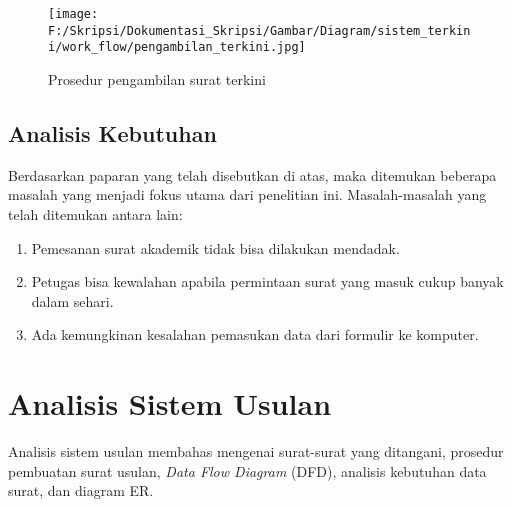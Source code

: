 \begin{figure}[H]
	\centering
		\texttt{[image: F:/Skripsi/Dokumentasi\_Skripsi/Gambar/Diagram/sistem\_terkini/work\_flow/pengambilan\_terkini.jpg]}
	{\caption{Prosedur pengambilan surat terkini}}
	\label{fig:pengambilan_terkini}
\end{figure}

\subsection{Analisis Kebutuhan}
\label{sec:analisis_kebutuhan}
Berdasarkan paparan yang telah disebutkan di atas, maka ditemukan beberapa masalah yang menjadi fokus utama dari penelitian ini. Masalah-masalah yang telah ditemukan antara lain:
\begin{enumerate}
	\item Pemesanan surat akademik tidak bisa dilakukan mendadak.
	\item Petugas bisa kewalahan apabila permintaan surat yang masuk cukup banyak dalam sehari.
	\item Ada kemungkinan kesalahan pemasukan data dari formulir ke komputer.
\end{enumerate}

\section{Analisis Sistem Usulan}
\label{sec:analisis_sistem_usulan}
Analisis sistem usulan membahas mengenai surat-surat yang ditangani, prosedur pembuatan surat usulan, \textit{Data Flow Diagram} (DFD), analisis kebutuhan data surat, dan diagram ER. \\

